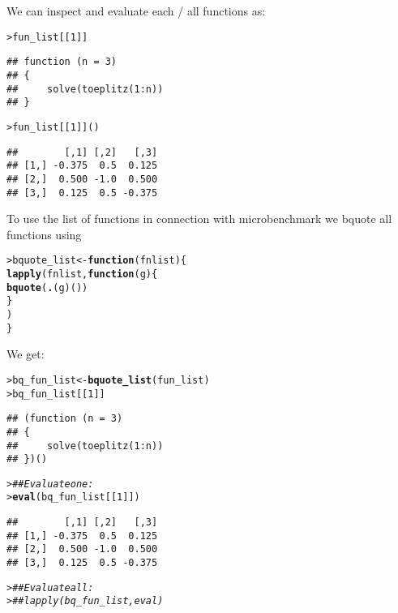 \documentclass[11pt]{article}\usepackage[]{graphicx}\usepackage[]{xcolor}
\makeatletter
\newcommand{\hlnum}[1]{\textcolor[rgb]{0.686,0.059,0.569}{#1}}%
\newcommand{\hlcom}[1]{\textcolor[rgb]{0.678,0.584,0.686}{\textit{#1}}}%
\newcommand{\hlstd}[1]{\textcolor[rgb]{0.345,0.345,0.345}{#1}}%
\newcommand{\hlkwa}[1]{\textcolor[rgb]{0.161,0.373,0.58}{\textbf{#1}}}%
\newcommand{\hlkwb}[1]{\textcolor[rgb]{0.69,0.353,0.396}{#1}}%
\newcommand{\hlkwc}[1]{\textcolor[rgb]{0.333,0.667,0.333}{#1}}%
\newcommand{\hlkwd}[1]{\textcolor[rgb]{0.737,0.353,0.396}{\textbf{#1}}}%
\newenvironment{kframe}{%
 \def\at@end@of@kframe{}%
 \ifinner\ifhmode%
  \def\at@end@of@kframe{\end{minipage}}%
  \begin{minipage}{\columnwidth}%
 \fi\fi%
 \def\FrameCommand##1{\hskip\@totalleftmargin \hskip-\fboxsep
 \colorbox{shadecolor}{##1}\hskip-\fboxsep
     \hskip-\linewidth \hskip-\@totalleftmargin \hskip\columnwidth}%
 \MakeFramed {\advance\hsize-\width
   \@totalleftmargin\z@ \linewidth\hsize
   \@setminipage}}%
 {\par\unskip\endMakeFramed%
 \at@end@of@kframe}
\newenvironment{knitrout}{}{} %
\makeatother
\begin{document}
We can inspect and evaluate each / all functions as:
\begin{knitrout}
\color{fgcolor}\begin{kframe}
\begin{alltt}
\hlstd{> }\hlstd{fun_list[[}\hlnum{1}\hlstd{]]}
\end{alltt}
\begin{verbatim}
## function (n = 3) 
## {
##     solve(toeplitz(1:n))
## }
\end{verbatim}
\begin{alltt}
\hlstd{> }\hlstd{fun_list[[}\hlnum{1}\hlstd{]]()}
\end{alltt}
\begin{verbatim}
##        [,1] [,2]   [,3]
## [1,] -0.375  0.5  0.125
## [2,]  0.500 -1.0  0.500
## [3,]  0.125  0.5 -0.375
\end{verbatim}
\end{kframe}
\end{knitrout}

To use the list of functions in connection with microbenchmark we bquote all functions using

\begin{knitrout}
\color{fgcolor}\begin{kframe}
\begin{alltt}
\hlstd{> }\hlstd{bquote_list} \hlkwb{<-} \hlkwa{function}\hlstd{(}\hlkwc{fnlist}\hlstd{)\{}
\hlstd{  }    \hlkwd{lapply}\hlstd{(fnlist,} \hlkwa{function}\hlstd{(}\hlkwc{g}\hlstd{) \{}
\hlstd{  }        \hlkwd{bquote}\hlstd{(}\hlkwd{.}\hlstd{(g)())}
\hlstd{  }    \hlstd{\}}
\hlstd{  }    \hlstd{)}
\hlstd{  }\hlstd{\}}
\end{alltt}
\end{kframe}
\end{knitrout}

We get:
\begin{knitrout}
\color{fgcolor}\begin{kframe}
\begin{alltt}
\hlstd{> }\hlstd{bq_fun_list} \hlkwb{<-} \hlkwd{bquote_list}\hlstd{(fun_list)}
\hlstd{> }\hlstd{bq_fun_list[[}\hlnum{1}\hlstd{]]}
\end{alltt}
\begin{verbatim}
## (function (n = 3) 
## {
##     solve(toeplitz(1:n))
## })()
\end{verbatim}
\begin{alltt}
\hlstd{> }\hlcom{## Evaluate one:}
\hlstd{> }\hlkwd{eval}\hlstd{(bq_fun_list[[}\hlnum{1}\hlstd{]])}
\end{alltt}
\begin{verbatim}
##        [,1] [,2]   [,3]
## [1,] -0.375  0.5  0.125
## [2,]  0.500 -1.0  0.500
## [3,]  0.125  0.5 -0.375
\end{verbatim}
\begin{alltt}
\hlstd{> }\hlcom{## Evaluate all:}
\hlstd{> }\hlcom{## lapply(bq_fun_list, eval)}
\end{alltt}
\end{kframe}
\end{knitrout}
\end{document}
